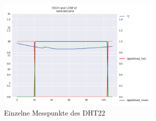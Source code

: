 \documentclass[12pt]{article}
\begin{document}
\begin{figure}[H]
\begin{center}
\includegraphics[width=0.7\textwidth]{pics/digitalRead.png}
\caption{Einzelne Messpunkte des DHT22}
\end{center}
\end{figure}
\end{document}
